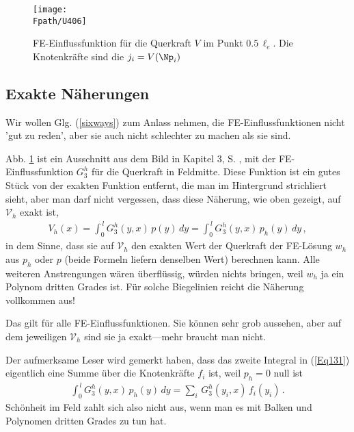 \begin{figure}[tbp]
\centering
\if {} \sidecaption \fi
\texttt{[image: \\Fpath/U406]}
\caption{FE-Einflussfunktion f\"{u}r die Querkraft $V$ im Punkt $0.5\,\ell_e$. Die Knotenkr\"{a}fte sind die $j_i = V(\Np_i)$}
\label{U406}
\end{figure}%


{\textcolor{blau2}{\section{Exakte N\"{a}herungen}}}\label{Korrektur18}

Wir wollen Glg. (\ref{sixways}) zum Anlass nehmen, die FE-Einflussfunktionen nicht 'gut zu reden', aber sie auch nicht schlechter zu machen als sie sind.

Abb. \ref{U406} ist ein Ausschnitt aus dem Bild in Kapitel 3, S. \pageref{U22}, mit der FE-Einflussfunktion $G_3^h$ f\"{u}r die Querkraft in Feldmitte. Diese Funktion ist ein gutes St\"{u}ck von der exakten Funktion entfernt, die man im Hintergrund strichliert sieht, aber man darf nicht vergessen, dass diese N\"{a}herung, wie oben gezeigt, auf $\mathcal{V}_h$ exakt ist,
\begin{align} \label{Eq131}
V_h(x) = \int_0^{\,l} G_3^h(y,x)\,p(y)\,dy = \int_0^{\,l} G_3^h(y,x)\,p_h(y)\,dy \,,
\end{align}
in dem Sinne, dass sie auf $\mathcal{V}_h$ den exakten Wert der Querkraft der FE-L\"{o}sung $w_h$ aus $p_h$ oder $p$ (beide Formeln liefern denselben Wert) berechnen kann. Alle weiteren Anstrengungen w\"{a}ren \"{u}berfl\"{u}ssig, w\"{u}rden nichts bringen, weil $w_h$ ja ein Polynom dritten Grades ist. F\"{u}r solche Biegelinien reicht die N\"{a}herung vollkommen aus!

Das gilt f\"{u}r alle FE-Einflussfunktionen. Sie k\"{o}nnen sehr grob aussehen, aber auf dem jeweiligen $\mathcal{V}_h$ sind sie ja exakt---mehr braucht man nicht.

Der aufmerksame Leser wird gemerkt haben, dass das zweite Integral in (\ref{Eq131}) eigentlich eine Summe \"{u}ber die Knotenkr\"{a}fte $f_i$ ist, weil $p_h = 0$ null ist
\begin{align}
\int_0^{\,l} G_3^h(y,x)\,p_h(y)\,dy = \sum_i\,G_3^ h(y_i,x)\,f_i(y_i)\,.
\end{align}
Sch\"{o}nheit im Feld zahlt sich also nicht aus, wenn man es mit Balken und Polynomen dritten Grades zu tun hat.

